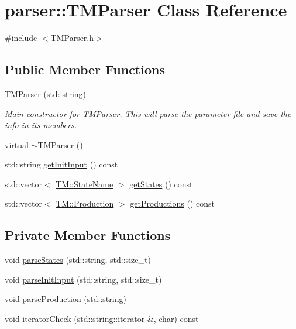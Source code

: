 \hypertarget{classparser_1_1TMParser}{\section{parser\-:\-:\-T\-M\-Parser \-Class \-Reference}
\label{d0/d6a/classparser_1_1TMParser}
}


{\ttfamily \#include $<$\-T\-M\-Parser.\-h$>$}

\subsection*{\-Public \-Member \-Functions}
\begin{DoxyCompactItemize}
\item 
\hyperlink{classparser_1_1TMParser_a7449386b475a892715af85ad31fa0015}{\-T\-M\-Parser} (std\-::string)
\begin{DoxyCompactList}\small\item\em \-Main constructor for \hyperlink{classparser_1_1TMParser}{\-T\-M\-Parser}. \-This will parse the parameter file and save the info in its members. \end{DoxyCompactList}\item 
virtual \hyperlink{classparser_1_1TMParser_a7dc139954aaa9f7bacd0c433fbbd3519}{$\sim$\-T\-M\-Parser} ()
\item 
std\-::string \hyperlink{classparser_1_1TMParser_a041286999146f207f2f127fdedd19403}{get\-Init\-Input} () const 
\item 
std\-::vector$<$ \hyperlink{namespaceTM_a852554502c474841ede5736b807839ff}{\-T\-M\-::\-State\-Name} $>$ \hyperlink{classparser_1_1TMParser_a218e4bf57cad53fa565cbe7bc9103181}{get\-States} () const 
\item 
std\-::vector$<$ \hyperlink{namespaceTM_a87460339f40338ea4e37433443965554}{\-T\-M\-::\-Production} $>$ \hyperlink{classparser_1_1TMParser_a582cb825725c2d6fb69dead1ce168065}{get\-Productions} () const 
\end{DoxyCompactItemize}
\subsection*{\-Private \-Member \-Functions}
\begin{DoxyCompactItemize}
\item 
void \hyperlink{classparser_1_1TMParser_aadb9e65b789495fc3dde6132d61ff53f}{parse\-States} (std\-::string, std\-::size\-\_\-t)
\item 
void \hyperlink{classparser_1_1TMParser_af238e382d917a1e09438d3d971dc375c}{parse\-Init\-Input} (std\-::string, std\-::size\-\_\-t)
\item 
void \hyperlink{classparser_1_1TMParser_a58ffe167af0cfb98089dafca94a8f891}{parse\-Production} (std\-::string)
\item 
void \hyperlink{classparser_1_1TMParser_a0f0fa124f3929c854f764914f644b6f2}{iterator\-Check} (std\-::string\-::iterator \&, char) const 
\end{DoxyCompactItemize}
